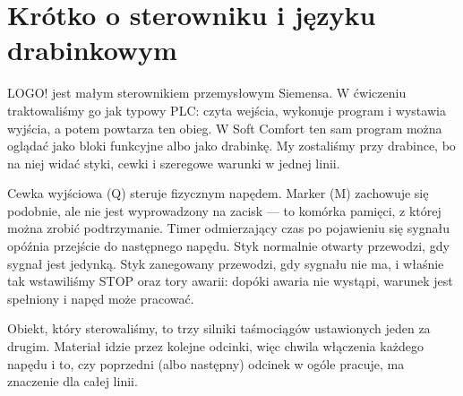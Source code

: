 \newpage
\section{Krótko o sterowniku i języku drabinkowym}

LOGO! jest małym sterownikiem przemysłowym Siemensa. W ćwiczeniu traktowaliśmy go jak typowy PLC: czyta wejścia, wykonuje program i wystawia wyjścia, a potem powtarza ten obieg. W Soft Comfort ten sam program można oglądać jako bloki funkcyjne albo jako drabinkę. My zostaliśmy przy drabince, bo na niej widać styki, cewki i szeregowe warunki w jednej linii.

Cewka wyjściowa (Q) steruje fizycznym napędem. Marker (M) zachowuje się podobnie, ale nie jest wyprowadzony na zacisk --- to komórka pamięci, z której można zrobić podtrzymanie. Timer odmierzający czas po pojawieniu się sygnału opóźnia przejście do następnego napędu. Styk normalnie otwarty przewodzi, gdy sygnał jest jedynką. Styk zanegowany przewodzi, gdy sygnału nie ma, i właśnie tak wstawiliśmy STOP oraz tory awarii: dopóki awaria nie wystąpi, warunek jest spełniony i napęd może pracować.

Obiekt, który sterowaliśmy, to trzy silniki taśmociągów ustawionych jeden za drugim. Materiał idzie przez kolejne odcinki, więc chwila włączenia każdego napędu i to, czy poprzedni (albo następny) odcinek w ogóle pracuje, ma znaczenie dla całej linii.
